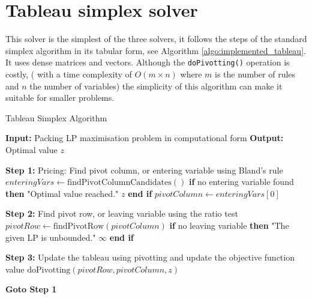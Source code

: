 \section{Tableau simplex solver}
This solver is the simplest of the three solvers, it follows the steps of the standard simplex
algorithm in its tabular form, see Algorithm \ref{algo:implemented_tableau}. It uses dense matrices and vectors.
Although the
\texttt{doPivotting()} operation is costly, ( with  a time complexity of \( O(m \times n) \) where $m$ is the number of rules and
$n$ the number of variables) the simplicity of this algorithm can make it suitable for
smaller problems.
\begin{algorithm}
    \caption{Tableau Simplex Algorithm}
    \begin{algorithmic}
        \State \textbf{Input:} Packing LP maximisation problem in computational form
        \State \textbf{Output:} Optimal value $z$

        \State \textbf{Step 1:} Pricing: Find pivot column, or entering variable using Bland's rule
        \State \hspace{\algorithmicindent} $enteringVars \gets \text{findPivotColumnCandidates}()$
        \State \hspace{\algorithmicindent} \textbf{if} no entering variable found \textbf{then}
        \State \hspace{\algorithmicindent} \hspace{\algorithmicindent}  "Optimal value reached."
        \State \hspace{\algorithmicindent} \hspace{\algorithmicindent} \Return $z$
        \State \hspace{\algorithmicindent} \textbf{end if}
        \State \hspace{\algorithmicindent} $pivotColumn \gets enteringVars[0]$

        \State \textbf{Step 2:} Find pivot row, or leaving variable using the ratio test
        \State \hspace{\algorithmicindent} $pivotRow \gets \text{findPivotRow}(pivotColumn)$
        \State \hspace{\algorithmicindent} \textbf{if} no leaving variable \textbf{then}
        \State \hspace{\algorithmicindent} \hspace{\algorithmicindent}  "The given LP is unbounded."
        \State \hspace{\algorithmicindent} \hspace{\algorithmicindent} \Return $\infty$
        \State \hspace{\algorithmicindent} \textbf{end if}

        \State \textbf{Step 3:} Update the tableau using pivotting and update the objective function value
        \State \hspace{\algorithmicindent} $\text{doPivotting}(pivotRow, pivotColumn, z)$

        \State \textbf{Goto Step 1}
    \end{algorithmic}
    \label{algo:implemented_tableau}
\end{algorithm}
